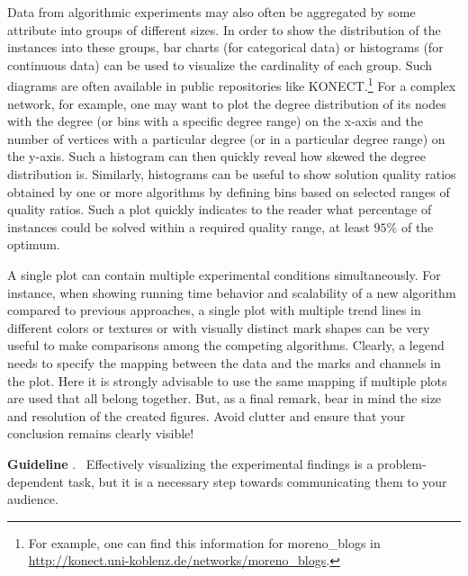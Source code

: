 \documentclass[algorithms,article,submit,moreauthors,pdftex]{Definitions/mdpi}
\newcounter{guideline}
\newcommand{\changed}[1]{#1}
\newcommand{\removed}[1]{}
\newcommand{\guideline}[1]{\par\smallskip\textbf{Guideline \theguideline\stepcounter{guideline}}.
\ #1\par\smallskip}
\begin{document}
Data from algorithmic experiments may also often be aggregated by some attribute into groups of different sizes.
In order to show the distribution of the instances into these groups, bar charts (for categorical data) or histograms (for continuous data) can be used to visualize the cardinality of each group.
Such diagrams are often available in public repositories like KONECT.\footnote{For example, one can
find this information for moreno\_blogs in \url{http://konect.uni-koblenz.de/networks/moreno_blogs}.}
%
For a complex network, for example, one may want to plot the degree distribution of its nodes with the degree (or bins with a specific degree range) on the x-axis and the number of vertices with a particular degree (or in a particular degree range) on the y-axis.
Such a histogram can then quickly reveal how skewed the degree distribution is.
Similarly, histograms can be useful to show solution quality ratios obtained by one or more algorithms by defining bins based on selected ranges of quality ratios.
Such a plot quickly indicates to the reader what percentage of instances could be solved within a required quality range, \eg  at least $95\%$ of the optimum. 
\removed{of the algorithm(s) and the $y$-axis displays the quality. This allows}

A single plot can contain multiple experimental conditions simultaneously.
For instance, when showing running time behavior and scalability of a new algorithm compared to previous approaches, a single plot with multiple trend lines in different colors or textures or with visually distinct mark shapes can be very useful to make comparisons among the competing algorithms.
Clearly, a legend needs to specify the mapping between the data and the marks and channels in the plot.
Here it is strongly advisable to use the same mapping if multiple  plots are used that all belong together.
But, as a final remark, bear in mind the size and resolution of the created figures.
Avoid clutter and ensure that your conclusion remains clearly visible!

\changed{\guideline{Effectively visualizing the experimental findings is a problem-dependent task,
but it is a necessary step towards communicating them to your audience.}}


\end{document}

